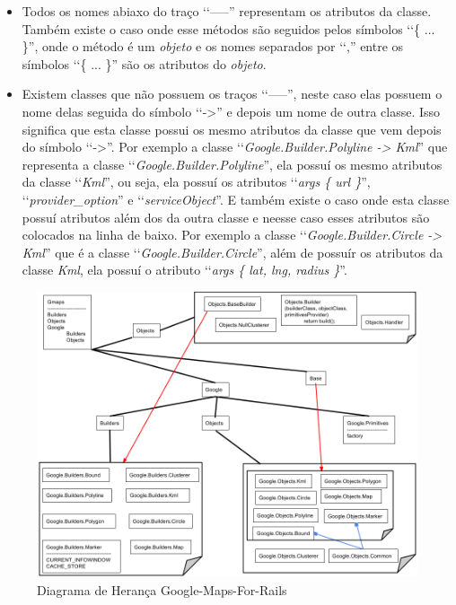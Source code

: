 \begin{itemize}
 
 \item Todos os nomes abiaxo do traço ‘‘-----'' representam os atributos da classe. Também 
 existe o caso onde esse métodos são seguidos pelos símbolos ‘‘\{ ... \}'', onde o método é um 
 \emph{objeto} e os nomes separados por ‘‘,'' entre os símbolos ‘‘\{ ... \}'' são os atributos
 do \emph{objeto}.
 
 \item Existem classes que não possuem os traços ‘‘-----'', neste caso elas possuem o nome delas
 seguida do símbolo ‘‘->'' e depois um nome de outra classe. Isso significa que esta classe 
 possui os mesmo atributos da classe que vem depois do símbolo ‘‘->''. Por exemplo a 
 classe ‘‘\emph{Google.Builder.Polyline -> Kml}'' que representa a classe 
 ‘‘\emph{Google.Builder.Polyline}'', ela possuí os mesmo atributos da classe
 ‘‘\emph{Kml}'', ou seja, ela possuí os atributos 
 ‘‘\emph{args \{ url \}}'', ‘‘\emph{provider\_option}'' e ‘‘\emph{serviceObject}''. E também existe o caso 
 onde esta classe possuí atributos além dos da outra classe e neesse caso esses 
 atributos são colocados na linha de baixo. Por exemplo a classe 
 ‘‘\emph{Google.Builder.Circle -> Kml}'' que é a classe ‘‘\emph{Google.Builder.Circle}'', além de 
 possuír os atributos da classe \emph{Kml}, ela possuí o atributo 
 ‘‘\emph{args \{ lat, lng, radius \}}''.
 
\end{itemize}

\begin{figure}[ht]
  \begin{center}     
    \includegraphics[scale=0.35]{images/diagrama_de_heranca_google_maps_for_rails.png}
    \caption{Diagrama de Herança Google-Maps-For-Rails}
   \label{fig:diagrama_de_heranca_google_maps_for_rails}
  \end{center}
\end{figure}

